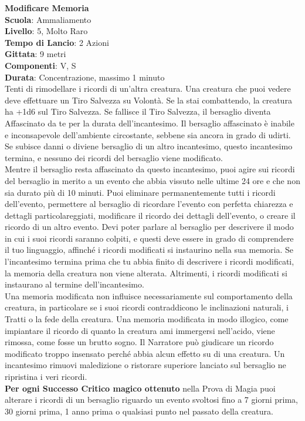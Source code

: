 \begin{multicols}{2}
\medskip\textbf{Modificare Memoria}\\
\textbf{Scuola}: Ammaliamento\\
\textbf{Livello}: 5, Molto Raro\\
\textbf{Tempo di Lancio}: 2 Azioni\\
\textbf{Gittata}: 9 metri\\
\textbf{Componenti}: V, S\\
\textbf{Durata}: Concentrazione, massimo 1 minuto\\
Tenti di rimodellare i ricordi di un'altra creatura. Una creatura che puoi vedere deve effettuare un Tiro Salvezza su Volontà. Se la stai combattendo, la creatura ha +1d6 sul Tiro Salvezza. Se fallisce il Tiro Salvezza, il bersaglio diventa Affascinato da te per la durata dell'incantesimo. Il bersaglio affascinato è inabile e inconsapevole dell'ambiente circostante, sebbene sia ancora in grado di udirti. Se subisce danni o diviene bersaglio di un altro incantesimo, questo incantesimo termina, e nessuno dei ricordi del bersaglio viene modificato.\\
Mentre il bersaglio resta affascinato da questo incantesimo, puoi agire sui ricordi del bersaglio in merito a un evento che abbia vissuto nelle ultime 24 ore e che non sia durato più di 10 minuti. Puoi eliminare permanentemente tutti i ricordi dell'evento, permettere al bersaglio di ricordare l'evento con perfetta chiarezza e dettagli particolareggiati, modificare il ricordo dei dettagli dell'evento, o creare il ricordo di un altro evento. Devi poter parlare al bersaglio per descrivere il modo in cui i suoi ricordi saranno colpiti, e questi deve essere in grado di comprendere il tuo linguaggio, affinché i ricordi modificati si instaurino nella sua memoria. Se l'incantesimo termina prima che tu abbia finito di descrivere i ricordi modificati, la memoria della creatura non viene alterata. Altrimenti, i ricordi modificati si instaurano al termine dell'incantesimo.\\
Una memoria modificata non influisce necessariamente sul comportamento della creatura, in particolare se i suoi ricordi contraddicono le inclinazioni naturali, i Tratti o la fede della creatura. Una memoria modificata in modo illogico, come impiantare il ricordo di quanto la creatura ami immergersi nell'acido, viene rimossa, come fosse un brutto sogno. Il Narratore può giudicare un ricordo modificato troppo insensato perché abbia alcun effetto su di una creatura. Un incantesimo rimuovi maledizione o ristorare superiore lanciato sul bersaglio ne ripristina i veri ricordi.\\
\textbf{Per ogni Successo Critico magico ottenuto} nella Prova di Magia puoi alterare i ricordi di un bersaglio riguardo un evento svoltosi fino a 7 giorni prima, 30 giorni prima, 1 anno prima o qualsiasi punto nel passato della creatura.


\end{multicols}
